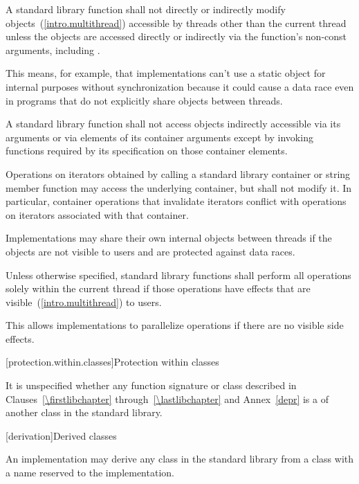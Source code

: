 \pnum
A \Cpp standard library function shall not directly or indirectly modify
objects~(\ref{intro.multithread}) accessible by threads other than the current thread
unless the objects are accessed directly or indirectly via the function's non-const
arguments, including .

\pnum
\enternote This means, for example, that implementations can't use a static object for
internal purposes without synchronization because it could cause a data race even in
programs that do not explicitly share objects between threads. \exitnote

\pnum
A \Cpp standard library function shall not access objects indirectly accessible via its
arguments or via elements of its container arguments except by invoking functions
required by its specification on those container elements.

\pnum
Operations on iterators obtained by calling a standard library container or string
member function may access the underlying container, but shall not modify it.
\enternote In particular, container operations that invalidate iterators conflict
with operations on iterators associated with that container. \exitnote

\pnum
Implementations may share their own internal objects between threads if the objects are
not visible to users and are protected against data races.

\pnum
Unless otherwise specified, \Cpp standard library functions shall perform all operations
solely within the current thread if those operations have effects that are
visible~(\ref{intro.multithread}) to users.

\pnum
\enternote This allows implementations to parallelize operations if there are no visible
%
side effects. \exitnote

[protection.within.classes]{Protection within classes}

\pnum
{}%
It is unspecified whether any function signature or class described in
Clauses~\ref{\firstlibchapter} through~\ref{\lastlibchapter} and Annex~\ref{depr} is a
of another class in the \Cpp standard library.

[derivation]{Derived classes}

\pnum
{}%
%
An implementation may derive any class in the \Cpp standard library from a class with a
name reserved to the implementation.

